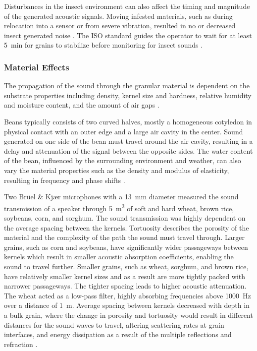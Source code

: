 \documentclass[../Vibro-Acoustic Signatures and Detection Algorithms for Stored Product Insects.tex]{subfiles}
\begin{document}
Disturbances in the insect environment can also affect the timing and magnitude of the generated acoustic signals. Moving infested materials, such as during relocation into a sensor or from severe vibration, resulted in no or decreased insect generated noise \cite{klaassenCharacterizationUltrasonicSignals1988}. The ISO standard guides the operator to wait for at least \SI{5}{\minute} for grains to stabilize before monitoring for insect sounds \cite{ISO6639Cereals1986}.

\subsubsection{Material Effects}

The propagation of the sound through the granular material is dependent on the substrate properties including density, kernel size and hardness, relative humidity and moisture content, and the amount of air gaps \cite{mankinPerspectivePromiseCentury2011}.

Beans typically consists of two curved halves, mostly a homogeneous cotyledon in physical contact with an outer edge and a large air cavity in the center. Sound generated on one side of the bean must travel around the air cavity, resulting in a delay and attenuation of the signal between the opposite sides. The water content of the bean, influenced by the surrounding environment and weather, can also vary the material properties such as the density and modulus of elasticity, resulting in frequency and phase shifts \cite{klaassenCharacterizationUltrasonicSignals1988}.

Two Br\"{u}el \& Kj\ae r microphones with a \SI{13}{\milli\meter} diameter measured the sound transmission of a speaker through \SI{5}{\meter\cubed} of soft and hard wheat, brown rice, soybeans, corn, and sorghum. The sound transmission was highly dependent on the average spacing between the kernels. Tortuosity describes the porosity of the material and the complexity of the path the sound must travel through. Larger grains, such as corn and soybeans, have significantly wider passageways between kernels which result in smaller acoustic absorption coefficients, enabling the sound to travel further. Smaller grains, such as wheat, sorghum, and brown rice, have relatively smaller kernel sizes and as a result are more tightly packed with narrower passageways. The tighter spacing leads to higher acoustic attenuation. The wheat acted as a low-pass filter, highly absorbing frequencies above \SI{1000}{\hertz} over a distance of \SI{1}{\meter}. Average spacing between kernels decreased with depth in a bulk grain, where the change in porosity and tortuosity would result in different distances for the sound waves to travel, altering scattering rates at grain interfaces, and energy dissipation as a result of the multiple reflections and refraction \cite{hicklingSoundTransmissionStored1995,hicklingStudiesSoundTransmission1997}.
\end{document}
